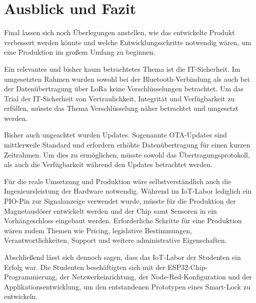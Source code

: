 
\chapter{Ausblick und Fazit}
Final lassen sich noch Überlegungen anstellen, wie das entwickelte Produkt verbessert werden könnte und welche Entwicklungsschritte notwendig wären, um eine Produktion im großem Umfang zu beginnen. 

Ein relevantes und bisher kaum betrachtetes Thema ist die IT-Sicherheit. Im umgesetzten Rahmen wurden sowohl bei der Bluetooth-Verbindung als auch bei der Datenübertragung über \ac{LoRa} keine Verschlüsselungen betrachtet. Um das Trial der IT-Sicherheit von Vertraulichkeit, Integrität und Verfügbarkeit zu erfüllen, müsste das Thema Verschlüsselung näher betrachtet und umgesetzt werden.

Bisher auch ungeachtet wurden Updates. Sogenannte \ac{OTA}-Updates sind mittlerweile Standard und erfordern erhöhte Datenübertragung für einen kurzen Zeitrahmen. Um dies zu ermöglichen, müsste sowohl das Übertragungsprotokoll, als auch die Verfügbarkeit während den Updates betrachtet werden.

Für die reale Umsetzung und Produktion wäre selbstverständlich auch die Ingenieursleistung der Hardware notwendig. Während im \ac{IoT}-Labor lediglich ein \ac{PIO}-Pin zur Signalanzeige verwendet wurde, müsste für die Produktion der Magnetauslöser entwickelt werden und der Chip samt Sensoren in ein Vorhängeschloss eingebaut werden. Erforderliche Schritte für eine Produktion wären zudem Themen wie Pricing, legislative Bestimmungen, Verantwortlichkeiten, Support und weitere administrative Eigenschaften.

Abschließend lässt sich dennoch sagen, dass das \ac{IoT}-Labor der Studenten ein Erfolg war. Die Studenten beschäftigten sich mit der ESP32-Chip-Programmierung, der Netzwerkeinrichtung, der Node-Red-Konfiguration und der Applikationsentwicklung, um den entstandenen Prototypen eines Smart-Lock zu entwickeln.
